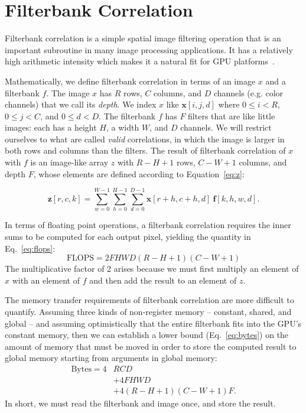 \documentclass{sig-alternate}
\begin{document}
\section{Filterbank Correlation}

\label{sec:fbcorr}

Filterbank correlation is a simple spatial image filtering operation that is
an important subroutine in many image processing applications. It has a relatively
high arithmetic intensity which makes it a natural fit for GPU platforms~\citep{pinto+cox:2011gcg}.

Mathematically, we define filterbank correlation in terms of an
image $x$ and a filterbank $f$.
The image $x$ has $R$ rows, $C$ columns, and $D$ channels (e.g. color
channels) that we call its {\em depth}. We index $x$ like $\mathbf{x}[i,j,d]$
where $0 \leq i < R$, $0 \leq j < C$, and $0 \leq d < D$.
The filterbank $f$ has $F$ filters that are like little images: each has a
height $H$, a width $W$, and $D$ channels.
We will restrict ourselves to what are called {\em valid} correlations, in
which the image is larger in both rows and columns than the filters.
The result of filterbank correlation of $x$ with $f$ is an image-like array
$z$ with $R-H+1$ rows, $C-W+1$ columns, and depth $F$, whose elements are
defined according to Equation~\ref{eq:z}:

\begin{equation}
    \mathbf{z}[r,c,k] = \sum_{w=0}^{W-1} \sum_{h=0}^{H-1} \sum_{d=0}^{D-1}
        \mathbf{x}[r+h, c+h, d]~ \mathbf{f}[k, h, w, d].
        \label{eq:z}
\end{equation}

In terms of floating point operations, a filterbank correlation requires the
inner sums to be computed for each output pixel, yielding the quantity in
Eq.~\ref{eq:flops}:
\begin{equation}
\mathrm{FLOPS} = 2  F  H  W  D  (R - H + 1)( C- W + 1)
\label{eq:flops}
\end{equation}
The multiplicative factor of 2 arises because we must first multiply an element of
$x$ with an element of $f$ and then add the result to an element of $z$.

The memory transfer requirements of filterbank correlation are more difficult to quantify.
Assuming three kinds of non-register memory -- constant, shared, and global --
and assuming optimistically that the entire filterbank fits into the GPU's constant memory,
then we can establish a lower bound (Eq.~\ref{eq:bytes}) on the amount of
memory that must be moved in order to store the computed result to global
memory starting from arguments in global memory:
\begin{align}
\mathrm{Bytes} = 4&RCD \nonumber \\
& + 4FHWD \nonumber \\
& + 4(R-H+1)(C-W+1)F.
\label{eq:bytes}
\end{align}
In short, we must read the filterbank and image once, and store the result.
\end{document}
